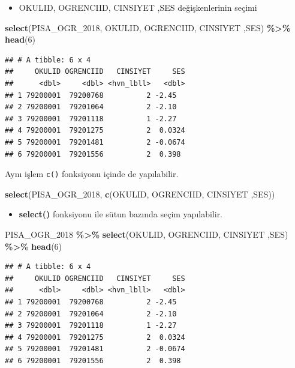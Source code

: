 \documentclass[
  oneside]{book}
\newenvironment{Shaded}{\begin{snugshade}}{\end{snugshade}}
\newcommand{\DecValTok}[1]{\textcolor[rgb]{0.00,0.00,0.81}{#1}}
\newcommand{\FunctionTok}[1]{\textcolor[rgb]{0.13,0.29,0.53}{\textbf{#1}}}
\newcommand{\NormalTok}[1]{#1}
\newcommand{\SpecialCharTok}[1]{\textcolor[rgb]{0.81,0.36,0.00}{\textbf{#1}}}
\providecommand{\tightlist}{%
  \setlength{\itemsep}{0pt}\setlength{\parskip}{0pt}}
\begin{document}
\begin{itemize}
\tightlist
\item
  OKULID, OGRENCIID, CINSIYET ,SES değişkenlerinin seçimi
\end{itemize}

\begin{Shaded}
\begin{Highlighting}[]
\FunctionTok{select}\NormalTok{(PISA\_OGR\_2018, OKULID, OGRENCIID, CINSIYET ,SES) }\SpecialCharTok{\%\textgreater{}\%} \FunctionTok{head}\NormalTok{(}\DecValTok{6}\NormalTok{)}
\end{Highlighting}
\end{Shaded}

\begin{verbatim}
## # A tibble: 6 x 4
##     OKULID OGRENCIID   CINSIYET     SES
##      <dbl>     <dbl> <hvn_lbll>   <dbl>
## 1 79200001  79200768          2 -2.45  
## 2 79200001  79201064          2 -2.10  
## 3 79200001  79201118          1 -2.27  
## 4 79200001  79201275          2  0.0324
## 5 79200001  79201481          2 -0.0674
## 6 79200001  79201556          2  0.398
\end{verbatim}

Aynı işlem \texttt{c()} fonksiyonu içinde de yapılabilir.

\begin{Shaded}
\begin{Highlighting}[]
\FunctionTok{select}\NormalTok{(PISA\_OGR\_2018, }\FunctionTok{c}\NormalTok{(OKULID, OGRENCIID, CINSIYET ,SES))}
\end{Highlighting}
\end{Shaded}

\begin{itemize}
\tightlist
\item
  \textbf{select()} fonksiyonu ile sütun bazında seçim yapılabilir.
\end{itemize}

\begin{Shaded}
\begin{Highlighting}[]
\NormalTok{PISA\_OGR\_2018 }\SpecialCharTok{\%\textgreater{}\%} \FunctionTok{select}\NormalTok{(OKULID, OGRENCIID, CINSIYET ,SES) }\SpecialCharTok{\%\textgreater{}\%} \FunctionTok{head}\NormalTok{(}\DecValTok{6}\NormalTok{)}
\end{Highlighting}
\end{Shaded}

\begin{verbatim}
## # A tibble: 6 x 4
##     OKULID OGRENCIID   CINSIYET     SES
##      <dbl>     <dbl> <hvn_lbll>   <dbl>
## 1 79200001  79200768          2 -2.45  
## 2 79200001  79201064          2 -2.10  
## 3 79200001  79201118          1 -2.27  
## 4 79200001  79201275          2  0.0324
## 5 79200001  79201481          2 -0.0674
## 6 79200001  79201556          2  0.398
\end{verbatim}
\end{document}
